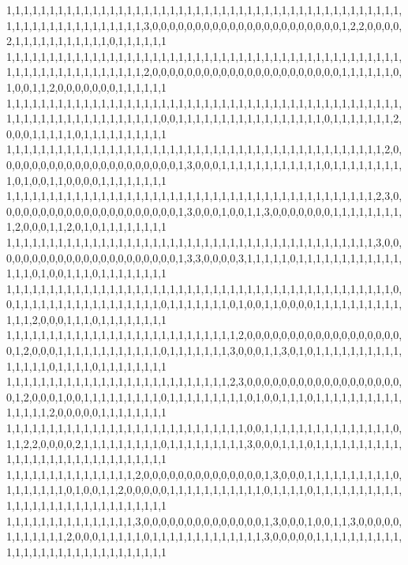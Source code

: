 1,1,1,1,1,1,1,1,1,1,1,1,1,1,1,1,1,1,1,1,1,1,1,1,1,1,1,1,1,1,1,1,1,1,1,1,1,1,1,1,1,1,1,1,1,1,1,1,1,1,1,1,1,1,1,1,1,1,1,1,1,1,3,0,0,0,0,0,0,0,0,0,0,0,0,0,0,0,0,0,0,0,0,0,0,1,2,2,0,0,0,0,2,1,1,1,1,1,1,1,1,1,1,1,0,1,1,1,1,1,1
1,1,1,1,1,1,1,1,1,1,1,1,1,1,1,1,1,1,1,1,1,1,1,1,1,1,1,1,1,1,1,1,1,1,1,1,1,1,1,1,1,1,1,1,1,1,1,1,1,1,1,1,1,1,1,1,1,1,1,1,1,1,2,0,0,0,0,0,0,0,0,0,0,0,0,0,0,0,0,0,0,0,0,0,0,1,1,1,1,1,1,0,1,0,0,1,1,2,0,0,0,0,0,0,0,1,1,1,1,1,1
1,1,1,1,1,1,1,1,1,1,1,1,1,1,1,1,1,1,1,1,1,1,1,1,1,1,1,1,1,1,1,1,1,1,1,1,1,1,1,1,1,1,1,1,1,1,1,1,1,1,1,1,1,1,1,1,1,1,1,1,1,1,1,1,0,0,1,1,1,1,1,1,1,1,1,1,1,1,1,1,1,1,1,0,1,1,1,1,1,1,1,2,0,0,0,1,1,1,1,1,0,1,1,1,1,1,1,1,1,1,1
1,1,1,1,1,1,1,1,1,1,1,1,1,1,1,1,1,1,1,1,1,1,1,1,1,1,1,1,1,1,1,1,1,1,1,1,1,1,1,1,1,1,1,1,2,0,0,0,0,0,0,0,0,0,0,0,0,0,0,0,0,0,0,0,0,0,1,3,0,0,0,1,1,1,1,1,1,1,1,1,1,1,1,0,1,1,1,1,1,1,1,1,1,0,1,0,0,1,1,0,0,0,0,1,1,1,1,1,1,1,1
1,1,1,1,1,1,1,1,1,1,1,1,1,1,1,1,1,1,1,1,1,1,1,1,1,1,1,1,1,1,1,1,1,1,1,1,1,1,1,1,1,1,1,2,3,0,0,0,0,0,0,0,0,0,0,0,0,0,0,0,0,0,0,0,0,0,1,3,0,0,0,1,0,0,1,1,3,0,0,0,0,0,0,0,1,1,1,1,1,1,1,1,1,2,0,0,0,1,1,2,0,1,0,1,1,1,1,1,1,1,1
1,1,1,1,1,1,1,1,1,1,1,1,1,1,1,1,1,1,1,1,1,1,1,1,1,1,1,1,1,1,1,1,1,1,1,1,1,1,1,1,1,1,1,3,0,0,0,0,0,0,0,0,0,0,0,0,0,0,0,0,0,0,0,0,0,0,1,3,3,0,0,0,0,3,1,1,1,1,1,0,1,1,1,1,1,1,1,1,1,1,1,1,1,1,1,0,1,0,0,1,1,1,0,1,1,1,1,1,1,1,1
1,1,1,1,1,1,1,1,1,1,1,1,1,1,1,1,1,1,1,1,1,1,1,1,1,1,1,1,1,1,1,1,1,1,1,1,1,1,1,1,1,1,1,1,1,0,0,1,1,1,1,1,1,1,1,1,1,1,1,1,1,1,1,1,0,1,1,1,1,1,1,1,0,1,0,0,1,1,0,0,0,0,1,1,1,1,1,1,1,1,1,1,1,1,1,2,0,0,0,1,1,1,0,1,1,1,1,1,1,1,1
1,1,1,1,1,1,1,1,1,1,1,1,1,1,1,1,1,1,1,1,1,1,1,1,1,1,1,2,0,0,0,0,0,0,0,0,0,0,0,0,0,0,0,0,0,0,0,1,2,0,0,0,1,1,1,1,1,1,1,1,1,1,1,1,0,1,1,1,1,1,1,1,3,0,0,0,1,1,3,0,1,0,1,1,1,1,1,1,1,1,1,1,1,1,1,1,1,0,1,1,1,1,0,1,1,1,1,1,1,1,1
1,1,1,1,1,1,1,1,1,1,1,1,1,1,1,1,1,1,1,1,1,1,1,1,1,1,2,3,0,0,0,0,0,0,0,0,0,0,0,0,0,0,0,0,0,0,0,1,2,0,0,0,1,0,0,1,1,1,1,1,1,1,1,1,0,1,1,1,1,1,1,1,1,1,0,1,0,0,1,1,1,0,1,1,1,1,1,1,1,1,1,1,1,1,1,1,1,2,0,0,0,0,0,1,1,1,1,1,1,1,1
1,1,1,1,1,1,1,1,1,1,1,1,1,1,1,1,1,1,1,1,1,1,1,1,1,1,1,1,0,0,1,1,1,1,1,1,1,1,1,1,1,1,1,1,1,0,1,1,2,2,0,0,0,0,2,1,1,1,1,1,1,1,1,1,0,1,1,1,1,1,1,1,1,1,3,0,0,0,1,1,1,0,1,1,1,1,1,1,1,1,1,1,1,1,1,1,1,1,1,1,1,1,1,1,1,1,1,1,1,1,1
1,1,1,1,1,1,1,1,1,1,1,1,1,1,1,2,0,0,0,0,0,0,0,0,0,0,0,0,0,0,1,3,0,0,0,1,1,1,1,1,1,1,1,1,1,0,1,1,1,1,1,1,1,0,1,0,0,1,1,2,0,0,0,0,0,1,1,1,1,1,1,1,1,1,1,1,0,1,1,1,1,0,1,1,1,1,1,1,1,1,1,1,1,1,1,1,1,1,1,1,1,1,1,1,1,1,1,1,1,1,1
1,1,1,1,1,1,1,1,1,1,1,1,1,1,1,3,0,0,0,0,0,0,0,0,0,0,0,0,0,0,1,3,0,0,0,1,0,0,1,1,3,0,0,0,0,0,1,1,1,1,1,1,1,2,0,0,0,1,1,1,1,1,0,1,1,1,1,1,1,1,1,1,1,1,1,1,3,0,0,0,0,0,1,1,1,1,1,1,1,1,1,1,1,1,1,1,1,1,1,1,1,1,1,1,1,1,1,1,1,1,1
